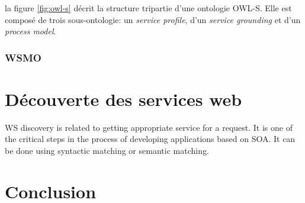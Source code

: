       la figure \ref{fig:owl-s} décrit la structure tripartie d'une
      ontologie \textsc{OWL-S}. Elle est composé de trois sous-ontologie: un
      \emph{service profile}, d'un \emph{service grounding} et d'un
      \emph{process model}.
      \subsubsection{WSMO}
      \cite{baryannis2010}
  \section{Découverte des services web}

  WS discovery is related to getting appropriate service for a request. It is one of the
  critical steps in the process of developing applications based on SOA. It can be done
  using syntactic matching or semantic matching\cite{Omer2011}.\\
  
  \section{Conclusion}


